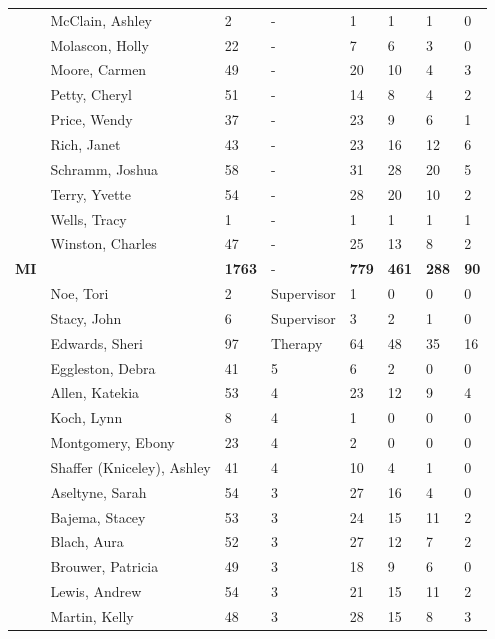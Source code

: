 \documentclass{article}\usepackage[]{graphicx}\usepackage[]{color}
\begin{document}
{\begin{longtable} { >{\raggedright}p{}p{}p{}p{}p{}p{}p{}p{}}
   & McClain, Ashley & 2 & - & 1 & 1 & 1 & 0 \\ 
   \rowcolor[gray]{0.90} & Molascon, Holly & 22 & - & 7 & 6 & 3 & 0 \\ 
   \rowcolor[gray]{0.90} & Moore, Carmen & 49 & - & 20 & 10 & 4 & 3 \\ 
   \rowcolor[gray]{0.90} & Petty, Cheryl & 51 & - & 14 & 8 & 4 & 2 \\ 
   & Price, Wendy & 37 & - & 23 & 9 & 6 & 1 \\ 
   & Rich, Janet & 43 & - & 23 & 16 & 12 & 6 \\ 
   & Schramm, Joshua & 58 & - & 31 & 28 & 20 & 5 \\ 
   \rowcolor[gray]{0.90} & Terry, Yvette & 54 & - & 28 & 20 & 10 & 2 \\ 
   \rowcolor[gray]{0.90} & Wells, Tracy & 1 & - & 1 & 1 & 1 & 1 \\ 
   \rowcolor[gray]{0.90} & Winston, Charles & 47 & - & 25 & 13 & 8 & 2 \\ 
   \hline
\textbf{MI} &  & \textbf{1763} & - & \textbf{779} & \textbf{461} & \textbf{288} & \textbf{90} \\ 
   & Noe, Tori & 2 & Supervisor & 1 & 0 & 0 & 0 \\ 
   & Stacy, John & 6 & Supervisor & 3 & 2 & 1 & 0 \\ 
   \rowcolor[gray]{0.90} & Edwards, Sheri & 97 & Therapy & 64 & 48 & 35 & 16 \\ 
   \rowcolor[gray]{0.90} & Eggleston, Debra & 41 & 5 & 6 & 2 & 0 & 0 \\ 
   \rowcolor[gray]{0.90} & Allen, Katekia & 53 & 4 & 23 & 12 & 9 & 4 \\ 
   & Koch, Lynn & 8 & 4 & 1 & 0 & 0 & 0 \\ 
   & Montgomery, Ebony & 23 & 4 & 2 & 0 & 0 & 0 \\ 
   & Shaffer (Kniceley), Ashley & 41 & 4 & 10 & 4 & 1 & 0 \\ 
   \rowcolor[gray]{0.90} & Aseltyne, Sarah & 54 & 3 & 27 & 16 & 4 & 0 \\ 
   \rowcolor[gray]{0.90} & Bajema, Stacey & 53 & 3 & 24 & 15 & 11 & 2 \\ 
   \rowcolor[gray]{0.90} & Blach, Aura & 52 & 3 & 27 & 12 & 7 & 2 \\ 
   & Brouwer, Patricia & 49 & 3 & 18 & 9 & 6 & 0 \\ 
   & Lewis, Andrew & 54 & 3 & 21 & 15 & 11 & 2 \\ 
   & Martin, Kelly & 48 & 3 & 28 & 15 & 8 & 3 \\ 

\end{longtable}}
\end{document}
